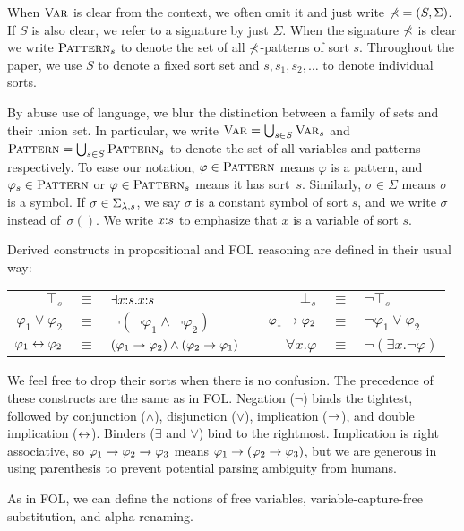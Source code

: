 \documentclass{amsart}
\begin{document}
When $\textnormal{\textsc{Var}}$ is clear from the context,
we often omit it and just write $\mathbb{\Sigma} = (S, \Sigma)$.
If $S$ is also clear, we refer to a signature
by just $\Sigma$.
When the signature $\mathbb{\Sigma}$ is clear
we write $\textnormal{\textsc{Pattern}}_s$ to denote 
the set of all $\mathbb{\Sigma}$-patterns of sort $s$.
Throughout the paper, we use $S$ to denote a fixed sort set
and $s,s_1,s_2,\dots$ to denote individual sorts.

By abuse use of language,
we blur the distinction between
a family of sets and their union set.
In particular, 
we write $\textnormal{\textsc{Var}} = \bigcup_{s \in S} \textnormal{\textsc{Var}}_s$
and $\textnormal{\textsc{Pattern}} = \bigcup_{s \in S} \textnormal{\textsc{Pattern}}_s$
to denote the set of all variables and patterns respectively.
To ease our notation,
$\varphi \in \textnormal{\textsc{Pattern}}$ means $\varphi$ is a pattern,
and $\varphi_s \in \textnormal{\textsc{Pattern}}$ or $\varphi \in \textnormal{\textsc{Pattern}}_s$ means
it has sort~$s$.
Similarly, $\sigma \in \Sigma$ means $\sigma$ is a symbol.
If $\sigma \in \Sigma_{\lambda, s}$, we say $\sigma$
is a constant symbol of sort $s$, and
we write $\sigma$ instead of~$\sigma()$.
We write $x {:} s$ to emphasize that $x$ is a variable of sort $s$.

Derived constructs in propositional and FOL reasoning
are defined in their usual way:
\begin{center}
\begin{tabular}{rclp{1cm}rcl}
$\top_s$ & $\equiv$ & $\exists x {:} s . x {:} s$
&&
$\bot_s$ & $\equiv$ & $\neg \top_s$
\\
$\varphi_1 \vee \varphi_2$ & $\equiv$ & 
$\neg (\neg \varphi_1 \wedge \neg \varphi_2)$
&&
$\varphi_1 \to \varphi_2$ & $\equiv$ &
$\neg \varphi_1 \vee \varphi_2$
\\
$\varphi_1 \leftrightarrow \varphi_2$ & $\equiv$ &
$(\varphi_1 \to \varphi_2) \wedge (\varphi_2 \to \varphi_1)$
&&
$\forall x . \varphi$ & $\equiv$ &
$\neg (\exists x . \neg \varphi)$
\end{tabular}
\end{center}
We feel free to drop their sorts when there is no confusion.
The precedence of these constructs are the same as in FOL.
Negation ($\neg$) binds the tightest, followed by
conjunction ($\wedge$),
disjunction ($\vee$),
implication ($\to$),
and double implication ($\leftrightarrow$).
Binders ($\exists$ and $\forall$) bind to the rightmost.
Implication is right associative, so
$\varphi_1 \to \varphi_2 \to \varphi_3$
means
$\varphi_1 \to (\varphi_2 \to \varphi_3)$,
but we are generous in using parenthesis 
to prevent potential parsing ambiguity from humans.

As in FOL, we can define the notions of free variables,
variable-capture-free substitution,
and alpha-renaming.
\end{document}

